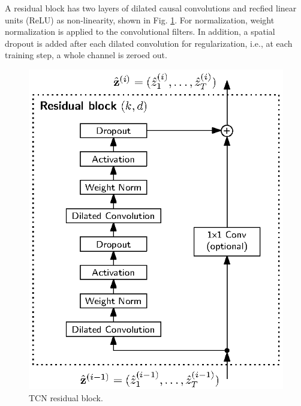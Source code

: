 \documentclass{scrartcl}
\begin{document}
A residual block has two layers of dilated causal convolutions and recfied linear units (ReLU) as non-linearity, shown in Fig. \ref{fig:residual_block}. For normalization, weight normalization \cite{Salimans2016} is applied to the convolutional filters. In addition, a spatial dropout \cite{Srivastava2014} is added after each dilated convolution for regularization, i.e., at each training step, a whole channel is zeroed out.
\begin{figure}[htbp]
\centering
\includegraphics[scale=1]{figures/residual_block.eps}
\caption{TCN residual block.}
\label{fig:residual_block} 
\end{figure}
\end{document}
